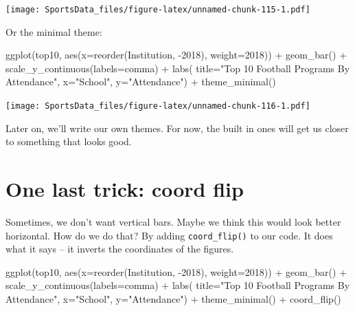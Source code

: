 \documentclass[
]{book}
\newenvironment{Shaded}{\begin{snugshade}}{\end{snugshade}}
\newcommand{\AttributeTok}[1]{\textcolor[rgb]{0.77,0.63,0.00}{#1}}
\newcommand{\FunctionTok}[1]{\textcolor[rgb]{0.00,0.00,0.00}{#1}}
\newcommand{\NormalTok}[1]{#1}
\newcommand{\SpecialCharTok}[1]{\textcolor[rgb]{0.00,0.00,0.00}{#1}}
\newcommand{\StringTok}[1]{\textcolor[rgb]{0.31,0.60,0.02}{#1}}
\begin{document}
\texttt{[image: SportsData\_files/figure-latex/unnamed-chunk-115-1.pdf]}

Or the minimal theme:

\begin{Shaded}
\begin{Highlighting}[]
\FunctionTok{ggplot}\NormalTok{(top10, }\FunctionTok{aes}\NormalTok{(}\AttributeTok{x=}\FunctionTok{reorder}\NormalTok{(Institution, }\SpecialCharTok{{-}}\StringTok{\textasciigrave{}}\AttributeTok{2018}\StringTok{\textasciigrave{}}\NormalTok{), }\AttributeTok{weight=}\StringTok{\textasciigrave{}}\AttributeTok{2018}\StringTok{\textasciigrave{}}\NormalTok{)) }\SpecialCharTok{+} 
  \FunctionTok{geom\_bar}\NormalTok{() }\SpecialCharTok{+} 
  \FunctionTok{scale\_y\_continuous}\NormalTok{(}\AttributeTok{labels=}\NormalTok{comma) }\SpecialCharTok{+} 
  \FunctionTok{labs}\NormalTok{(}
    \AttributeTok{title=}\StringTok{"Top 10 Football Programs By Attendance"}\NormalTok{, }
    \AttributeTok{x=}\StringTok{"School"}\NormalTok{, }
    \AttributeTok{y=}\StringTok{"Attendance"}\NormalTok{) }\SpecialCharTok{+} 
  \FunctionTok{theme\_minimal}\NormalTok{()}
\end{Highlighting}
\end{Shaded}

\texttt{[image: SportsData\_files/figure-latex/unnamed-chunk-116-1.pdf]}

Later on, we'll write our own themes. For now, the built in ones will get us closer to something that looks good.

\hypertarget{one-last-trick-coord-flip}{%
\section{One last trick: coord flip}\label{one-last-trick-coord-flip}}

Sometimes, we don't want vertical bars. Maybe we think this would look better horizontal. How do we do that? By adding \texttt{coord\_flip()} to our code. It does what it says -- it inverts the coordinates of the figures.

\begin{Shaded}
\begin{Highlighting}[]
\FunctionTok{ggplot}\NormalTok{(top10, }\FunctionTok{aes}\NormalTok{(}\AttributeTok{x=}\FunctionTok{reorder}\NormalTok{(Institution, }\SpecialCharTok{{-}}\StringTok{\textasciigrave{}}\AttributeTok{2018}\StringTok{\textasciigrave{}}\NormalTok{), }\AttributeTok{weight=}\StringTok{\textasciigrave{}}\AttributeTok{2018}\StringTok{\textasciigrave{}}\NormalTok{)) }\SpecialCharTok{+} 
  \FunctionTok{geom\_bar}\NormalTok{() }\SpecialCharTok{+} 
  \FunctionTok{scale\_y\_continuous}\NormalTok{(}\AttributeTok{labels=}\NormalTok{comma) }\SpecialCharTok{+} 
  \FunctionTok{labs}\NormalTok{(}
    \AttributeTok{title=}\StringTok{"Top 10 Football Programs By Attendance"}\NormalTok{, }
    \AttributeTok{x=}\StringTok{"School"}\NormalTok{, }
    \AttributeTok{y=}\StringTok{"Attendance"}\NormalTok{) }\SpecialCharTok{+} 
  \FunctionTok{theme\_minimal}\NormalTok{() }\SpecialCharTok{+} 
  \FunctionTok{coord\_flip}\NormalTok{()}
\end{Highlighting}
\end{Shaded}
\end{document}
